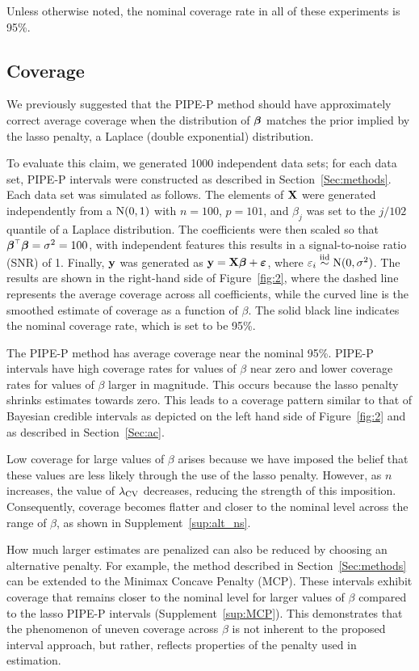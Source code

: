 Unless otherwise noted, the nominal coverage rate in all of these experiments is 95\%.

\subsection{Coverage}
\label{Sec:coverage}

We previously suggested that the PIPE-P method should have approximately correct average coverage when the distribution of $\boldsymbol{\beta}$ matches the prior implied by the lasso penalty, a Laplace (double exponential) distribution.

To evaluate this claim, we generated 1000 independent data sets; for each data set, PIPE-P intervals were constructed as described in Section~\ref{Sec:methods}. Each data set was simulated as follows. The elements of $\mathbf{X}$ were generated independently from a $\textrm{N}(0, 1)$ with $n = 100$, $p = 101$, and $\beta_j$ was set to the $j/102$ quantile of a Laplace distribution. The coefficients were then scaled so that $\boldsymbol{\beta} ^{\scriptscriptstyle\top}\boldsymbol{\beta} = \sigma^2 = 100$, with independent features this results in a signal-to-noise ratio (SNR) of 1. Finally, $\mathbf{y}$ was generated as $\mathbf{y} = \mathbf{X}\boldsymbol{\beta} + \boldsymbol{\varepsilon}$, where $\varepsilon_i \overset{\text{iid}}{\sim} \textrm{N}(0, \sigma^2)$. The results are shown in the right-hand side of Figure~\ref{fig:2}, where the dashed line represents the average coverage across all coefficients, while the curved line is the smoothed estimate of coverage as a function of $\beta$. The solid black line indicates the nominal coverage rate, which is set to be 95\%.

The PIPE-P method has average coverage near the nominal 95\%. PIPE-P intervals have high coverage rates for values of $\beta$ near zero and lower coverage rates for values of $\beta$ larger in magnitude. This occurs because the lasso penalty shrinks estimates towards zero. This leads to a coverage pattern similar to that of Bayesian credible intervals as depicted on the left hand side of Figure~\ref{fig:2} and as described in Section~\ref{Sec:ac}.

Low coverage for large values of $\beta$ arises because we have imposed the belief that these values are less likely through the use of the lasso penalty. However, as $n$ increases, the value of $\lambda_{\textrm{CV}}$ decreases, reducing the strength of this imposition. Consequently, coverage becomes flatter and closer to the nominal level across the range of $\beta$, as shown in Supplement~\ref{sup:alt_ns}.

How much larger estimates are penalized can also be reduced by choosing an alternative penalty. For example, the method described in Section~\ref{Sec:methods} can be extended to the Minimax Concave Penalty (MCP). These intervals exhibit coverage that remains closer to the nominal level for larger values of $\beta$ compared to the lasso PIPE-P intervals (Supplement~\ref{sup:MCP}). This demonstrates that the phenomenon of uneven coverage across $\beta$ is not inherent to the proposed interval approach, but rather, reflects properties of the penalty used in estimation.

